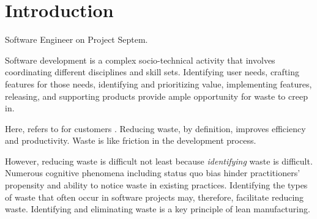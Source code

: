 %
\IEEEpeerreviewmaketitle

\section{Introduction}
 \textemdash Software Engineer on Project Septem.

Software development is a complex socio-technical activity that involves coordinating different disciplines and skill sets. Identifying user needs, crafting features for those needs, identifying and prioritizing value, implementing features, releasing, and supporting products provide ample opportunity for waste to creep in. 

Here,  refers to  for customers \cite{WomackLeanThinking}. Reducing waste, by definition, improves efficiency and productivity. Waste is like friction in the development process.

However, reducing waste is difficult not least because \textit{identifying} waste is difficult.  Numerous cognitive phenomena including status quo bias \cite{JostDecadeOfSystemJustification} hinder practitioners' propensity and ability to notice waste in existing practices. Identifying the types of waste that often occur in software projects  may, therefore, facilitate reducing waste. Identifying and eliminating waste is a key principle of lean manufacturing. 

